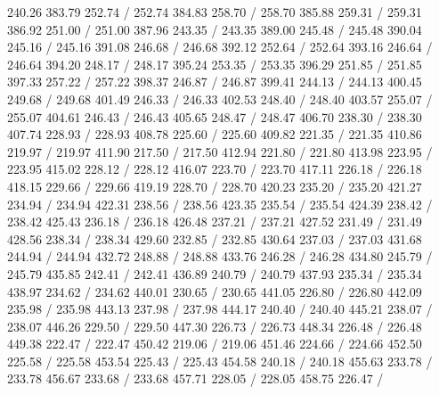 { 240.26 383.79 252.74 /
 252.74 384.83 258.70 /
 258.70 385.88 259.31 /
 259.31 386.92 251.00 /
 251.00 387.96 243.35 /
 243.35 389.00 245.48 /
 245.48 390.04 245.16 /
 245.16 391.08 246.68 /
 246.68 392.12 252.64 /
 252.64 393.16 246.64 /
 246.64 394.20 248.17 /
 248.17 395.24 253.35 /
 253.35 396.29 251.85 /
 251.85 397.33 257.22 /
 257.22 398.37 246.87 /
 246.87 399.41 244.13 /
 244.13 400.45 249.68 /
 249.68 401.49 246.33 /
 246.33 402.53 248.40 /
 248.40 403.57 255.07 /
 255.07 404.61 246.43 /
 246.43 405.65 248.47 /
 248.47 406.70 238.30 /
 238.30 407.74 228.93 /
 228.93 408.78 225.60 /
 225.60 409.82 221.35 /
 221.35 410.86 219.97 /
 219.97 411.90 217.50 /
 217.50 412.94 221.80 /
 221.80 413.98 223.95 /
 223.95 415.02 228.12 /
 228.12 416.07 223.70 /
 223.70 417.11 226.18 /
 226.18 418.15 229.66 /
 229.66 419.19 228.70 /
 228.70 420.23 235.20 /
 235.20 421.27 234.94 /
 234.94 422.31 238.56 /
 238.56 423.35 235.54 /
 235.54 424.39 238.42 /
 238.42 425.43 236.18 /
 236.18 426.48 237.21 /
 237.21 427.52 231.49 /
 231.49 428.56 238.34 /
 238.34 429.60 232.85 /
 232.85 430.64 237.03 /
 237.03 431.68 244.94 /
 244.94 432.72 248.88 /
 248.88 433.76 246.28 /
 246.28 434.80 245.79 /
 245.79 435.85 242.41 /
 242.41 436.89 240.79 /
 240.79 437.93 235.34 /
 235.34 438.97 234.62 /
 234.62 440.01 230.65 /
 230.65 441.05 226.80 /
 226.80 442.09 235.98 /
 235.98 443.13 237.98 /
 237.98 444.17 240.40 /
 240.40 445.21 238.07 /
 238.07 446.26 229.50 /
 229.50 447.30 226.73 /
 226.73 448.34 226.48 /
 226.48 449.38 222.47 /
 222.47 450.42 219.06 /
 219.06 451.46 224.66 /
 224.66 452.50 225.58 /
 225.58 453.54 225.43 /
 225.43 454.58 240.18 /
 240.18 455.63 233.78 /
 233.78 456.67 233.68 /
 233.68 457.71 228.05 /
 228.05 458.75 226.47 /
}
